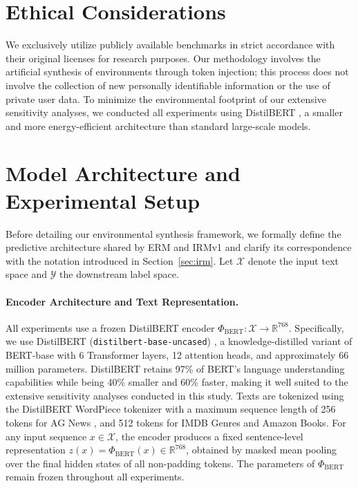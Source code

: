 \documentclass[11pt]{article}
\theoremstyle{definition}
\theoremstyle{plain}
\begin{document}
\section*{Ethical Considerations}

We exclusively utilize publicly available benchmarks in strict accordance with their original licenses for research purposes. Our methodology involves the artificial synthesis of environments through token injection; this process does not involve the collection of new personally identifiable information or the use of private user data. To minimize the environmental footprint of our extensive sensitivity analyses, we conducted all experiments using DistilBERT \citep{sanh2019distilbert}, a smaller and more energy-efficient architecture than standard large-scale models.



\appendix

\section{Model Architecture and Experimental Setup}
\label{app:model-setup}

Before detailing our environmental synthesis framework, we formally define the predictive architecture shared by ERM and IRMv1 and clarify its correspondence with the notation introduced in Section~\ref{sec:irm}. Let $\mathcal{X}$ denote the input text space and $\mathcal{Y}$ the downstream label space.

\paragraph{Encoder Architecture and Text Representation.} All experiments use a frozen DistilBERT encoder $\Phi_{\text{BERT}}: \mathcal{X} \rightarrow \mathbb{R}^{768}$. Specifically, we use DistilBERT (\texttt{distilbert-base-uncased}) \citep{sanh2019distilbert}, a knowledge-distilled variant of BERT-base with 6 Transformer layers, 12 attention heads, and approximately 66 million parameters. DistilBERT retains 97\% of BERT's language understanding capabilities while being 40\% smaller and 60\% faster, making it well suited to the extensive sensitivity analyses conducted in this study. Texts are tokenized using the DistilBERT WordPiece tokenizer with a maximum sequence length of 256 tokens for AG News \citep{zhang2015characterlevel}, and 512 tokens for IMDB Genres and Amazon Books. For any input sequence $x \in \mathcal{X}$, the encoder produces a fixed sentence-level representation $z(x) = \Phi_{\text{BERT}}(x) \in \mathbb{R}^{768}$, obtained by masked mean pooling over the final hidden states of all non-padding tokens. The parameters of $\Phi_{\text{BERT}}$ remain frozen throughout all experiments.
\end{document}
